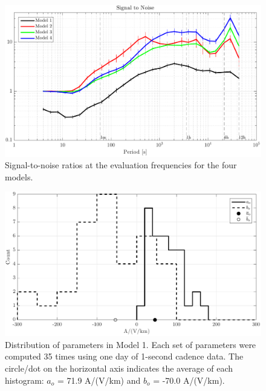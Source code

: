 \documentclass[draft,linenumbers]{agujournal2018}
\begin{document}
\begin{figure}[h]
\centering
\includegraphics[width=\textwidth]{figures/plot_TF_aves_SN-options-1.pdf}
\caption{Signal-to-noise ratios at the evaluation frequencies for the four models.}
\label{SN}
\end{figure}

\begin{figure}[h]
\centering
\includegraphics[width=\textwidth]{figures/plot_TF_aves_aobo_histograms-options-1.pdf}
\caption{Distribution of parameters in Model 1. Each set of parameters were computed 35 times using one day of 1-second cadence data. The circle/dot on the horizontal axis indicates the average of each histogram: $a_o$ = 71.9 A/(V/km) and $b_o$ = -70.0 A/(V/km).}
\label{histogram}
\end{figure}
\end{document}
